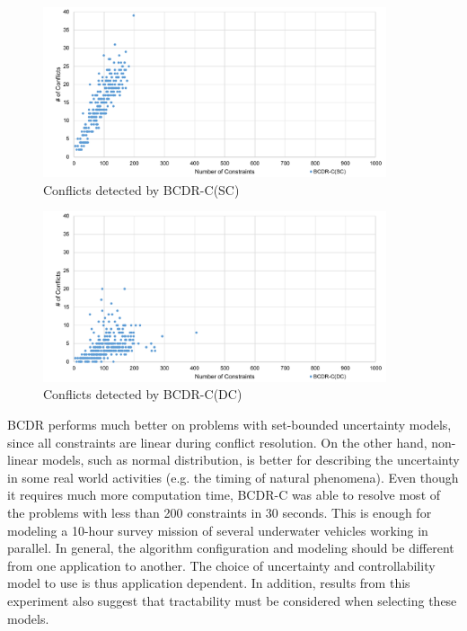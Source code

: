 \documentclass[jair,twoside,11pt,theapa]{article}
\begin{document}
\begin{figure}[!ht]
	\centering
	\includegraphics[width=0.9\textwidth]{figures/results/bcdr_cc_sc_conflicts.pdf}
	\caption{Conflicts detected by BCDR-C(SC)}
	\label{fig:bcdrc_sc_conflicts_results}
\end{figure}


\begin{figure}[!ht]
	\centering
	\includegraphics[width=0.9\textwidth]{figures/results/bcdr_cc_dc_conflicts.pdf}
	\caption{Conflicts detected by BCDR-C(DC)}
	\label{fig:bcdrc_dc_conflicts_results}
\end{figure}


BCDR performs much better on problems with set-bounded uncertainty models, since
all constraints are linear during conflict resolution. On the other hand,
non-linear models, such as normal distribution, is better for describing the
uncertainty in some real world activities (e.g. the timing of natural
phenomena). Even though it requires much more computation time, BCDR-C was able
to resolve most of the problems with less than 200 constraints in 30 seconds.
This is enough for modeling a 10-hour survey mission of several underwater
vehicles working in parallel. In general, the algorithm configuration and
modeling should be different from one application to another. The choice of
uncertainty and controllability model to use is thus application dependent. In
addition, results from this experiment also suggest that tractability must be
considered when selecting these models.
\end{document}
